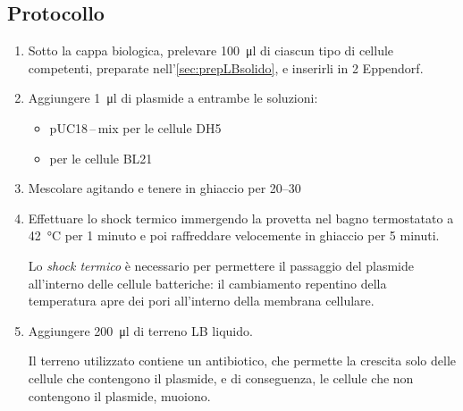 \subsection{Protocollo}
\begin{enumerate}
	\item Sotto la cappa biologica, prelevare \qty{100}{\micro\litre} di ciascun tipo di cellule competenti, preparate nell'\autoref{sec:prepLBsolido}, e inserirli in 2 \foreignlanguage{german}{Eppendorf}.
	\item Aggiungere \qty{1}{\micro\litre} di plasmide a entrambe le soluzioni:
	\begin{itemize}[person]
		\item pUC18\,--\,mix per le cellule DH5\textalpha
		\item {} per le cellule BL21
	\end{itemize}
	\item Mescolare agitando e tenere in ghiaccio per \qtyrange{20}{30}{\min}
	\item Effettuare lo shock termico immergendo la provetta nel bagno termostatato a \qty{42}{\celsius} per 1 minuto e poi raffreddare velocemente in ghiaccio per 5 minuti.
	\begin{myBox}
		Lo \textit{shock termico} è necessario per permettere il passaggio del plasmide all’interno delle cellule batteriche: il cambiamento repentino della temperatura apre dei pori all’interno della membrana cellulare.
	\end{myBox}
	\item Aggiungere \qty{200}{\micro\litre} di terreno LB liquido. 
	\begin{Note}
		Il terreno utilizzato contiene un antibiotico, che permette la crescita solo delle cellule che contengono il plasmide, e di conseguenza, le cellule che non contengono il plasmide, muoiono.


\end{Note}
\end{enumerate}
